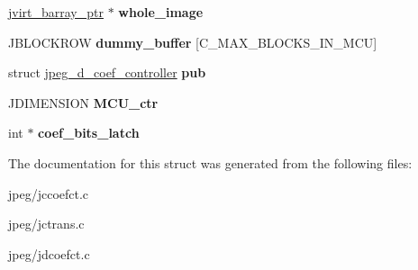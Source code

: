 \begin{DoxyCompactItemize}
\item 
\hyperlink{structjvirt__barray__control}{jvirt\+\_\+barray\+\_\+ptr} $\ast$ {\bfseries whole\+\_\+image}\hypertarget{structmy__coef__controller_a7e6db8186140ced6ed561b2860c84819}{}\label{structmy__coef__controller_a7e6db8186140ced6ed561b2860c84819}

\item 
J\+B\+L\+O\+C\+K\+R\+OW {\bfseries dummy\+\_\+buffer} \mbox{[}C\+\_\+\+M\+A\+X\+\_\+\+B\+L\+O\+C\+K\+S\+\_\+\+I\+N\+\_\+\+M\+CU\mbox{]}\hypertarget{structmy__coef__controller_a5cffa07081b1c4361d9dfe48373c8240}{}\label{structmy__coef__controller_a5cffa07081b1c4361d9dfe48373c8240}

\item 
struct \hyperlink{structjpeg__d__coef__controller}{jpeg\+\_\+d\+\_\+coef\+\_\+controller} {\bfseries pub}\hypertarget{structmy__coef__controller_a09524018020a2d7edbbcd92400f0919a}{}\label{structmy__coef__controller_a09524018020a2d7edbbcd92400f0919a}

\item 
J\+D\+I\+M\+E\+N\+S\+I\+ON {\bfseries M\+C\+U\+\_\+ctr}\hypertarget{structmy__coef__controller_a17ccbcfc9a173194725050412855d7cf}{}\label{structmy__coef__controller_a17ccbcfc9a173194725050412855d7cf}

\item 
int $\ast$ {\bfseries coef\+\_\+bits\+\_\+latch}\hypertarget{structmy__coef__controller_a04a1fed969821365fc54733467a120b9}{}\label{structmy__coef__controller_a04a1fed969821365fc54733467a120b9}

\end{DoxyCompactItemize}


The documentation for this struct was generated from the following files\+:\begin{DoxyCompactItemize}
\item 
jpeg/jccoefct.\+c\item 
jpeg/jctrans.\+c\item 
jpeg/jdcoefct.\+c\end{DoxyCompactItemize}

